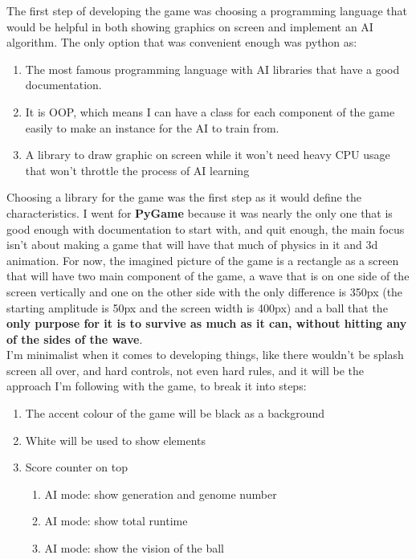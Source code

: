 
The first step of developing the game was choosing a programming language that would be helpful in both showing graphics on screen and implement an AI algorithm. The only option that was convenient enough was python as:

\begin{enumerate}
	\item The most famous programming language with AI libraries that have a good documentation.
	\item It is OOP, which means I can have a class for each component of the game easily to make an instance for the AI to train from.
	\item A library to draw graphic on screen while it won't need heavy CPU usage that won't throttle the process of AI learning 
\end{enumerate}

Choosing a library for the game was the first step as it would define the characteristics. I went for \textbf{PyGame} because it was nearly the only one that is good enough with documentation to start with, and quit enough, the main focus isn't about making a game that will have that much of physics in it and 3d animation. For now, the imagined picture of the game is a rectangle as a screen that will have two main component of the game, a wave that is on one side of the screen vertically and one on the other side with the only difference is 350px (the starting amplitude is 50px and the screen width is 400px) and a ball that the \textbf{only purpose for it is to survive as much as it can, without hitting any of the sides of the wave}.\\


I'm minimalist when it comes to developing things, like there wouldn't be splash screen all over, and hard controls, not even hard rules, and it will be the approach I'm following with the game, to break it into steps:

\begin{enumerate}
	\item The accent colour of the game will be black as a background
	\item White will be used to show elements 
	\item Score counter on top
	  \begin{enumerate}
		\item AI mode: show generation and genome number
		\item AI mode: show total runtime
		\item AI mode: show the vision of the ball
	\end{enumerate}
\end{enumerate}

